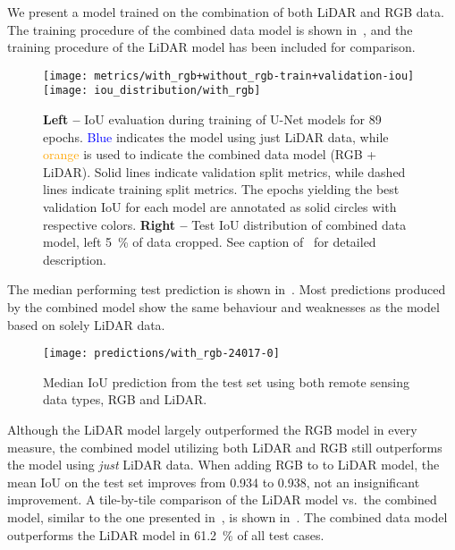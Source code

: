 We present a model trained on the combination of both LiDAR and RGB data.
The training procedure of the combined data model is shown in~, and the training procedure of the LiDAR model has been included for comparison.

\begin{figure}[H]
  \centering
  \texttt{[image: metrics/with\_rgb+without\_rgb-train+validation-iou]}
  \texttt{[image: iou\_distribution/with\_rgb]}
  \caption{%
    \textbf{Left --} IoU evaluation during training of U-Net models for 89 epochs.
    \textcolor{blue}{Blue} indicates the model using just LiDAR data, while \textcolor{orange}{orange} is used to indicate the combined data model (RGB + LiDAR).
    Solid lines indicate validation split metrics, while dashed lines indicate training split metrics.
    The epochs yielding the best validation IoU for each model are annotated as solid circles with respective colors.
    \textbf{Right --} Test IoU distribution of combined data model, left \SI{5}{\percent} of data cropped.
    See caption of~ for detailed description.
  }%
  \label{fig:rgb-lidar-training}
\end{figure}

The median performing test prediction is shown in~.
Most predictions produced by the combined model show the same behaviour and weaknesses as the model based on solely LiDAR data.

\begin{figure}[H]
  \centering
  \texttt{[image: predictions/with\_rgb-24017-0]}  %
  \caption{%
    Median IoU prediction from the test set using both remote sensing data types, RGB and LiDAR.
  }%
  \label{fig:rgb-lidar-median}
\end{figure}

Although the LiDAR model largely outperformed the RGB model in every measure, the combined model utilizing both LiDAR and RGB still outperforms the model using \emph{just} LiDAR data.
When adding RGB to to LiDAR model, the mean IoU on the test set improves from \num{0.934} to \num{0.938}, not an insignificant improvement.
A tile-by-tile comparison of the LiDAR model vs.\ the combined model, similar to the one presented in~, is shown in~.
The combined data model outperforms the LiDAR model in \SI{61.2}{\percent} of all test cases.


